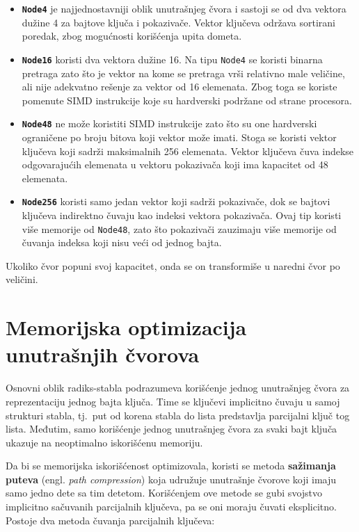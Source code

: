 \documentclass[12pt,oneside]{memoir}
\begin{document}
\begin{itemize}

  \item \textbf{\texttt{Node4}} je najjednostavniji oblik unutrašnjeg čvora
        i sastoji se od
        dva vektora dužine 4 za bajtove ključa i pokazivače. Vektor ključeva
        održava sortirani poredak, zbog mogućnosti korišćenja upita dometa.
  \item \textbf{\texttt{Node16}} koristi dva vektora dužine 16.
        Na tipu \texttt{Node4}
        se koristi binarna pretraga zato što je vektor na kome se pretraga vrši
        relativno male veličine, ali nije adekvatno rešenje za vektor od 16
        elemenata. Zbog toga se koriste pomenute SIMD instrukcije koje su
        hardverski podržane od strane procesora.
  \item \textbf{\texttt{Node48}} ne može koristiti SIMD instrukcije zato što su one
        hardverski ograničene po broju bitova koji vektor može imati. Stoga se
        koristi vektor ključeva koji sadrži maksimalnih 256 elemenata.
        Vektor ključeva čuva indekse odgovarajućih elemenata u vektoru
        pokazivača koji ima kapacitet od 48 elemenata.
  \item \textbf{\texttt{Node256}} koristi samo jedan vektor koji sadrži pokazivače,
        dok se bajtovi ključeva indirektno čuvaju kao indeksi vektora
        pokazivača. Ovaj tip koristi više memorije od \texttt{Node48},
        zato što pokazivači zauzimaju više memorije od čuvanja indeksa
        koji nisu veći od jednog bajta.

\end{itemize}

\noindent Ukoliko čvor popuni svoj kapacitet, onda se on transformiše u naredni
čvor po veličini.

\section{Memorijska optimizacija unutrašnjih čvorova}

Osnovni oblik radiks-stabla podrazumeva korišćenje jednog unutrašnjeg čvora za
reprezentaciju jednog bajta ključa. Time se ključevi implicitno čuvaju u samoj
strukturi stabla, tj.\ put od korena stabla do lista predstavlja parcijalni ključ
tog lista. Međutim, samo korišćenje jednog unutrašnjeg čvora za svaki bajt ključa
ukazuje na neoptimalno iskorišćenu memoriju.

Da bi se memorijska iskorišćenost optimizovala, koristi se metoda
\textbf{sažimanja puteva} (engl. \emph{path compression}) koja udružuje unutrašnje
čvorove koji imaju samo jedno dete sa tim detetom. Korišćenjem ove metode se
gubi svojstvo implicitno sačuvanih parcijalnih ključeva, pa se oni moraju čuvati
eksplicitno. Postoje dva metoda čuvanja parcijalnih ključeva:
\end{document}
